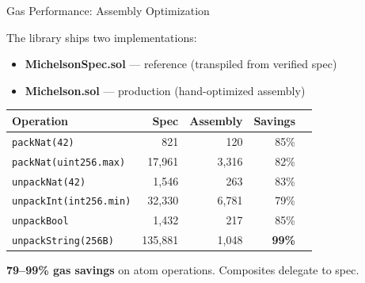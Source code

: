 \documentclass[aspectratio=169,10pt]{beamer}
\begin{document}
\begin{frame}{Gas Performance: Assembly Optimization}

The library ships two implementations:

\begin{itemize}
  \item \textbf{MichelsonSpec.sol} --- reference (transpiled from verified spec)
  \item \textbf{Michelson.sol} --- production (hand-optimized assembly)
\end{itemize}

\bigskip

\begin{center}
\begin{tabular}{@{}lrrrr@{}}
\toprule
\textbf{Operation} & \textbf{Spec} & \textbf{Assembly} & \textbf{Savings} \\
\midrule
\texttt{packNat(42)}            & 821     & 120     & 85\% \\
\texttt{packNat(uint256.max)}   & 17,961  & 3,316   & 82\% \\
\texttt{unpackNat(42)}          & 1,546   & 263     & 83\% \\
\texttt{unpackInt(int256.min)}  & 32,330  & 6,781   & 79\% \\
\texttt{unpackBool}             & 1,432   & 217     & 85\% \\
\texttt{unpackString(256B)}     & 135,881 & 1,048   & \textbf{99\%} \\
\bottomrule
\end{tabular}
\end{center}

\smallskip
\centering\textbf{79--99\% gas savings} on atom operations. Composites delegate to spec.
\end{frame}
\end{document}
